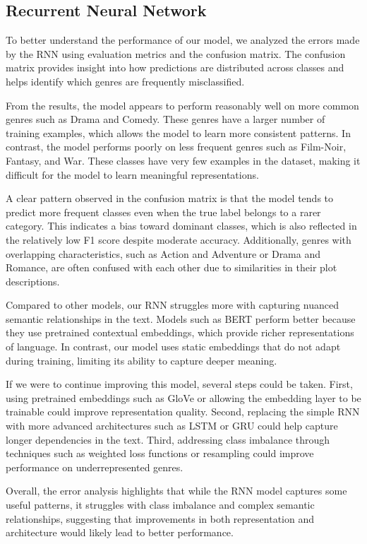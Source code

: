 \subsection{Recurrent Neural Network}

To better understand the performance of our model, we analyzed the errors made by the RNN using evaluation metrics and the confusion matrix. The confusion matrix provides insight into how predictions are distributed across classes and helps identify which genres are frequently misclassified.

From the results, the model appears to perform reasonably well on more common genres such as Drama and Comedy. These genres have a larger number of training examples, which allows the model to learn more consistent patterns. In contrast, the model performs poorly on less frequent genres such as Film-Noir, Fantasy, and War. These classes have very few examples in the dataset, making it difficult for the model to learn meaningful representations.

A clear pattern observed in the confusion matrix is that the model tends to predict more frequent classes even when the true label belongs to a rarer category. This indicates a bias toward dominant classes, which is also reflected in the relatively low F1 score despite moderate accuracy. Additionally, genres with overlapping characteristics, such as Action and Adventure or Drama and Romance, are often confused with each other due to similarities in their plot descriptions.

Compared to other models, our RNN struggles more with capturing nuanced semantic relationships in the text. Models such as BERT perform better because they use pretrained contextual embeddings, which provide richer representations of language. In contrast, our model uses static embeddings that do not adapt during training, limiting its ability to capture deeper meaning.

If we were to continue improving this model, several steps could be taken. First, using pretrained embeddings such as GloVe or allowing the embedding layer to be trainable could improve representation quality. Second, replacing the simple RNN with more advanced architectures such as LSTM or GRU could help capture longer dependencies in the text. Third, addressing class imbalance through techniques such as weighted loss functions or resampling could improve performance on underrepresented genres.

Overall, the error analysis highlights that while the RNN model captures some useful patterns, it struggles with class imbalance and complex semantic relationships, suggesting that improvements in both representation and architecture would likely lead to better performance.